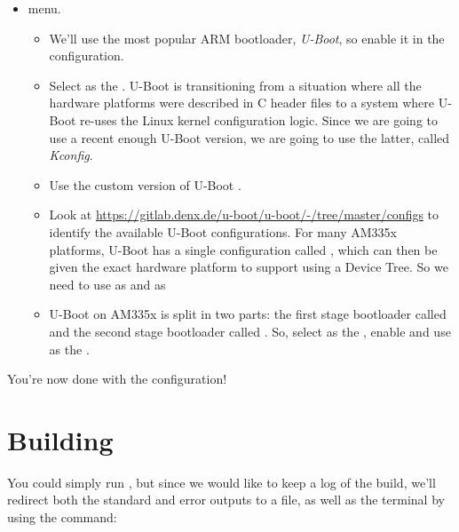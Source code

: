\begin{itemize}
\item {} menu.

  \begin{itemize}

  \item We'll use the most popular ARM bootloader, {\em U-Boot}, so
    enable it in the configuration.

  \item Select  as the . U-Boot is
    transitioning from a situation where all the hardware platforms
    were described in C header files to a system where U-Boot re-uses
    the Linux kernel configuration logic. Since we are going to use a
    recent enough U-Boot version, we are going to use the latter,
    called {\em Kconfig}.

  \item Use the custom version of U-Boot .

  \item Look at
    \url{https://gitlab.denx.de/u-boot/u-boot/-/tree/master/configs} to
    identify the available U-Boot configurations. For many AM335x
    platforms, U-Boot has a single configuration called
    , which can then be given the exact
    hardware platform to support using a Device Tree. So we need to
    use  as  and
     as 

  \item U-Boot on AM335x is split in two parts: the first stage
    bootloader called  and the second stage bootloader
    called . So, select  as the
    , enable  and use  as the .

  \end{itemize}

\end{itemize}

You're now done with the configuration!

\section{Building}

You could simply run , but since we would like to keep a
log of the build, we'll redirect both the standard and error outputs
to a file, as well as the terminal by using the  command:

